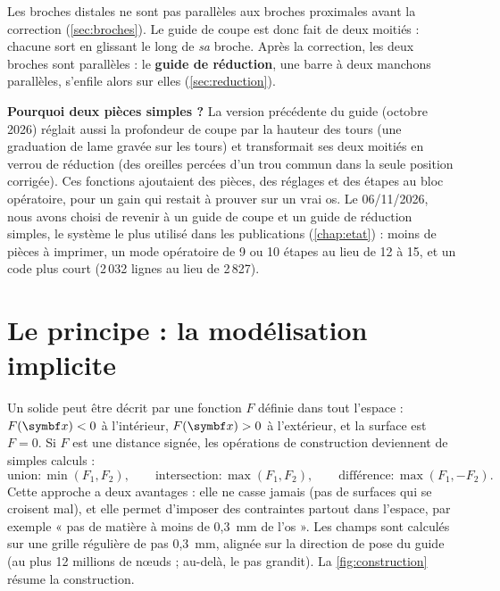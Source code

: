 Les broches distales ne sont pas parallèles aux broches proximales avant la correction (\cref{sec:broches}). Le guide
de coupe est donc fait de deux moitiés : chacune sort en glissant le long de \emph{sa} broche. Après la correction, les deux broches sont parallèles : le \textbf{guide de réduction}, une barre à
deux manchons parallèles, s'enfile alors sur elles (\cref{sec:reduction}).

\begin{pourquoi}
\textbf{Pourquoi deux pièces simples ?} La version précédente du guide (octobre 2026) réglait aussi la profondeur de
coupe par la hauteur des tours (une graduation de lame gravée sur les tours) et transformait ses deux moitiés en verrou
de réduction (des oreilles percées d'un trou commun dans la seule position corrigée). Ces fonctions ajoutaient des
pièces, des réglages et des étapes au bloc opératoire, pour un gain qui restait à prouver sur un vrai os. Le
06/11/2026, nous avons choisi de revenir à un guide de coupe et un guide de réduction simples, le système le plus
utilisé dans les publications (\cref{chap:etat}) : moins de pièces à imprimer, un mode opératoire de 9 ou 10 étapes au
lieu de 12 à 15, et un code plus court (2\,032 lignes au lieu de 2\,827).
\end{pourquoi}

\section{Le principe : la modélisation implicite}
\label{sec:implicite}

Un solide peut être décrit par une fonction $F$ définie dans tout l'espace : $F(\vb{x}) < 0$ à l'intérieur,
$F(\vb{x}) > 0$ à l'extérieur, et la surface est $F = 0$. Si $F$ est une distance signée, les opérations de
construction deviennent de simples calculs :
\begin{equation}
  \text{union} : \min(F_1, F_2), \qquad
  \text{intersection} : \max(F_1, F_2), \qquad
  \text{différence} : \max(F_1, -F_2).
\end{equation}
Cette approche a deux avantages : elle ne casse jamais (pas de surfaces qui se croisent mal), et elle permet
d'imposer des contraintes partout dans l'espace, par exemple « pas de matière à moins de 0,3~mm de l'os ». Les champs
sont calculés sur une grille régulière de pas 0,3~mm, alignée sur la direction de pose du guide (au plus 12 millions de
nœuds ; au-delà, le pas grandit). La \cref{fig:construction} résume la construction.


